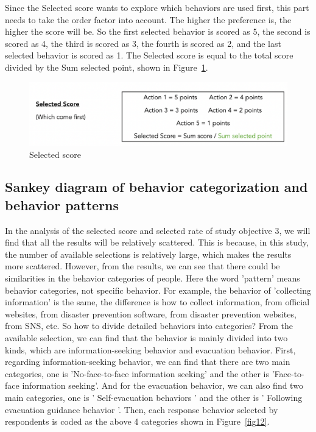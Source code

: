 Since the Selected score wants to explore which behaviors are used first, this part needs to take the order factor into account. The higher the preference is, the higher the score will be. So the first selected behavior is scored as 5, the second is scored as 4, the third is scored as 3, the fourth is scored as 2, and the last selected behavior is scored as 1. The Selected score is equal to the total score divided by the Sum selected point, shown in Figure~\ref{fig11}.

\begin{figure}[h]
  \includegraphics[width=\linewidth]{Figure/Figure11.png}
  \centering
  \caption{Selected score}
  \label{fig11}
\end{figure}

\subsection{Sankey diagram of behavior categorization and behavior patterns}

In the analysis of the selected score and selected rate of study objective 3, we will find that all the results will be relatively scattered. This is because, in this study, the number of available selections is relatively large, which makes the results more scattered. However, from the results, we can see that there could be similarities in the behavior categories of people. Here the word 'pattern' means behavior categories, not specific behavior. For example, the behavior of  'collecting information' is the same, the difference is how to collect information, from official websites, from disaster prevention software, from disaster prevention websites, from SNS, etc. So how to divide detailed behaviors into categories? From the available selection, we can find that the behavior is mainly divided into two kinds, which are information-seeking behavior and evacuation behavior. First, regarding information-seeking behavior, we can find that there are two main categories, one is 'No-face-to-face information seeking' and the other is 'Face-to-face information seeking'. And for the evacuation behavior, we can also find two main categories, one is ' Self-evacuation behaviors ' and the other is ' Following evacuation guidance behavior '. Then, each response behavior selected by respondents is coded as the above 4 categories shown in Figure~\ref{fig12}.

